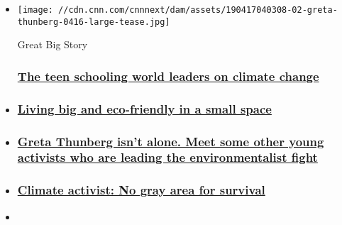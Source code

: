\begin{itemize}
\item
  \href{https://www.greatbigstory.com/stories/the-brave-young-activist}{}

  \texttt{[image: //cdn.cnn.com/cnnnext/dam/assets/190417040308-02-greta-thunberg-0416-large-tease.jpg]}

  Great Big Story

  \hypertarget{the-teen-schooling-world-leaders-on-climate-change}{%
  \subsubsection{\texorpdfstring{\href{https://www.greatbigstory.com/stories/the-brave-young-activist}{The
  teen schooling world leaders on climate
  change}}{The teen schooling world leaders on climate change}}\label{the-teen-schooling-world-leaders-on-climate-change}}
\item
  \hypertarget{living-big-and-eco-friendly-in-a-small-space}{%
  \subsubsection{\texorpdfstring{\href{/videos/tv/2019/04/18/iyw-small-space-living.cnn}{Living
  big and eco-friendly in a small
  space}}{Living big and eco-friendly in a small space}}\label{living-big-and-eco-friendly-in-a-small-space}}
\item
  \hypertarget{greta-thunberg-isnt-alone-meet-some-other-young-activists-who-are-leading-the-environmentalist-fight}{%
  \subsubsection{\texorpdfstring{\href{/2019/09/28/world/youth-environment-activists-greta-thunberg-trnd/index.html}{Greta
  Thunberg isn't alone. Meet some other young activists who are leading
  the environmentalist
  fight}}{Greta Thunberg isn't alone. Meet some other young activists who are leading the environmentalist fight}}\label{greta-thunberg-isnt-alone-meet-some-other-young-activists-who-are-leading-the-environmentalist-fight}}
\item
  \hypertarget{climate-activist-no-gray-area-for-survival}{%
  \subsubsection{\texorpdfstring{\href{/videos/tv/2019/02/01/amanpour-greta-thunberg.cnn}{Climate
  activist: No gray area for
  survival}}{Climate activist: No gray area for survival}}\label{climate-activist-no-gray-area-for-survival}}
\item
  \hypertarget{trashtag-viral-challenge-sends-internet-on-a-garbage-hunt}{%
}
\end{itemize}
